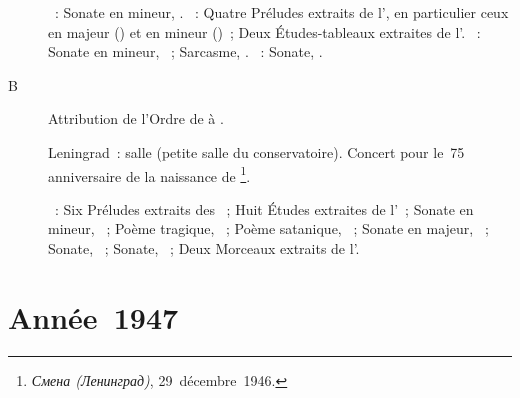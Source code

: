 \begin{description}
 \textsc{\Glazounov{}}~: Sonate en \kB \Flat mineur, .
 \textsc{\Rachmaninov{}}~: Quatre Préludes extraits de l', en
 particulier ceux en \kD majeur () et en \kC mineur ()~;
 Deux Études-tableaux extraites de l'.
 \textsc{\Prokofiev{}}~: Sonate en \kA mineur, ~; Sarcasme,
  .
 \textsc{\Scriabine{}}~: Sonate, .
 \item[B\DateWithWeekDay{1946-12-28}]
 Attribution de l'\hbox{Ordre} de \Lenin{} à \VSofronitsky{}.
 \item[\DateWithWeekDay{1946-12-29}]
 Leningrad~: salle \Glazounov{} (petite salle du conservatoire).
 Concert pour le~75\ieme{} anniversaire de la naissance de \Scriabine{}%
 \footnote{\foreignlanguage{russian}{\emph{Смена (Ленинград)}},
 29~décembre~1946.}.

 \textsc{\Scriabine{}}~: Six Préludes extraits des ~;
 Huit Études extraites de l'~; Sonate en \kF \Sharp mineur,
 ~; Poème tragique, ~; Poème satanique, ~; Sonate
 en \kF \Sharp majeur, ~; Sonate, ~; Sonate, ~;
 Deux Morceaux extraits de l'.
\end{description}

\section{Année~1947}

